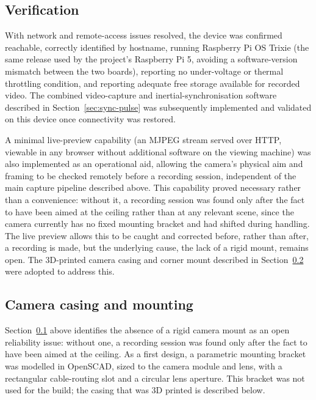\subsection{Verification}
\label{sec:pi-verification}

With network and remote-access issues resolved, the device was confirmed reachable, correctly identified by hostname, running Raspberry Pi OS Trixie (the same release used by the project's Raspberry Pi 5, avoiding a software-version mismatch between the two boards), reporting no under-voltage or thermal throttling condition, and reporting adequate free storage available for recorded video. The combined video-capture and inertial-synchronisation software described in Section~\ref{sec:sync-pulse} was subsequently implemented and validated on this device once connectivity was restored.

A minimal live-preview capability (an MJPEG stream served over HTTP, viewable in any browser without additional software on the viewing machine) was also implemented as an operational aid, allowing the camera's physical aim and framing to be checked remotely before a recording session, independent of the main capture pipeline described above. This capability proved necessary rather than a convenience: without it, a recording session was found only after the fact to have been aimed at the ceiling rather than at any relevant scene, since the camera currently has no fixed mounting bracket and had shifted during handling. The live preview allows this to be caught and corrected before, rather than after, a recording is made, but the underlying cause, the lack of a rigid mount, remains open. The 3D-printed camera casing and corner mount described in Section~\ref{sec:camera-mount} were adopted to address this.

\subsection{Camera casing and mounting}
\label{sec:camera-mount}

Section~\ref{sec:pi-verification} above identifies the absence of a rigid camera mount as an open reliability issue: without one, a recording session was found only after the fact to have been aimed at the ceiling. As a first design, a parametric mounting bracket was modelled in OpenSCAD, sized to the camera module and lens, with a rectangular cable-routing slot and a circular lens aperture. This bracket was not used for the build; the casing that was 3D printed is described below.

